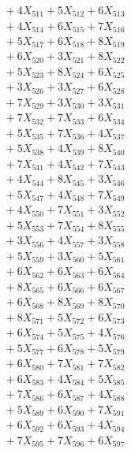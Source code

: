 \documentclass[a4paper,10pt]{article}
\begin{document}
{\begin{align}
&\;  + 4 X_{511} + 5 X_{512} + 6 X_{513} \\[0.3ex]
&\;  + 4 X_{514} + 6 X_{515} + 7 X_{516} \\[0.3ex]
&\;  + 5 X_{517} + 6 X_{518} + 8 X_{519} \\[0.5ex]\allowbreak
&\;  + 6 X_{520} + 3 X_{521} + 8 X_{522} \\[0.3ex]
&\;  + 5 X_{523} + 8 X_{524} + 6 X_{525} \\[0.3ex]
&\;  + 3 X_{526} + 3 X_{527} + 6 X_{528} \\[0.3ex]
&\;  + 7 X_{529} + 3 X_{530} + 3 X_{531} \\[0.3ex]
&\;  + 7 X_{532} + 7 X_{533} + 6 X_{534} \\[0.3ex]
&\;  + 5 X_{535} + 7 X_{536} + 4 X_{537} \\[0.3ex]
&\;  + 5 X_{538} + 4 X_{539} + 8 X_{540} \\[0.3ex]
&\;  + 7 X_{541} + 4 X_{542} + 7 X_{543} \\[0.3ex]
&\;  + 4 X_{544} + 8 X_{545} + 3 X_{546} \\[0.3ex]
&\;  + 5 X_{547} + 4 X_{548} + 7 X_{549} \\[0.5ex]\allowbreak
&\;  + 4 X_{550} + 7 X_{551} + 3 X_{552} \\[0.3ex]
&\;  + 5 X_{553} + 7 X_{554} + 8 X_{555} \\[0.3ex]
&\;  + 3 X_{556} + 4 X_{557} + 3 X_{558} \\[0.3ex]
&\;  + 5 X_{559} + 3 X_{560} + 5 X_{561} \\[0.3ex]
&\;  + 6 X_{562} + 6 X_{563} + 6 X_{564} \\[0.3ex]
&\;  + 8 X_{565} + 6 X_{566} + 6 X_{567} \\[0.3ex]
&\;  + 6 X_{568} + 8 X_{569} + 8 X_{570} \\[0.3ex]
&\;  + 8 X_{571} + 5 X_{572} + 6 X_{573} \\[0.3ex]
&\;  + 6 X_{574} + 5 X_{575} + 4 X_{576} \\[0.3ex]
&\;  + 5 X_{577} + 6 X_{578} + 5 X_{579} \\[0.5ex]\allowbreak
&\;  + 6 X_{580} + 7 X_{581} + 7 X_{582} \\[0.3ex]
&\;  + 6 X_{583} + 4 X_{584} + 5 X_{585} \\[0.3ex]
&\;  + 7 X_{586} + 6 X_{587} + 4 X_{588} \\[0.3ex]
&\;  + 5 X_{589} + 6 X_{590} + 7 X_{591} \\[0.3ex]
&\;  + 6 X_{592} + 6 X_{593} + 4 X_{594} \\[0.3ex]
&\;  + 7 X_{595} + 7 X_{596} + 6 X_{597} \\[0.3ex]

\end{align}}
\end{document}
